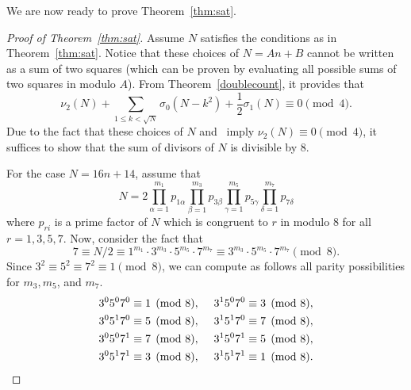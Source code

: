 \documentclass[a4paper,oneside,reqno]{amsart}
\theoremstyle{plain}
\theoremstyle{definition}
\theoremstyle{remark}
\begin{document}
		We are now ready to prove Theorem~\ref{thm:sat}.
		\begin{proof}[Proof of Theorem~\ref{thm:sat}]
		Assume $N$ satisfies the conditions as in Theorem~\ref{thm:sat}. Notice that these choices of $N=An+B$ cannot be written as a sum of two squares (which can be proven by evaluating all possible sums of two squares in modulo $A$).  From Theorem~\ref{doublecount}, it provides that
		$$\nu_2(N)+\sum\limits_{1 \leq k < \sqrt{N}} \sigma_0(N-k^2)+\frac{1}{2}\sigma_1(N) \equiv 0 \pmod4.$$
		Due to the fact that these choices of $N$ and~\cite{keith2017partitions} imply $\nu_2(N)\equiv0\pmod4$, it suffices to show that the sum of divisors of $N$ is divisible by 8.
		
		For the case $N=16n+14$, assume that
		$$N=2\prod_{\alpha=1}^{m_1}p_{1\alpha} \prod_{\beta=1}^{m_3}p_{3\beta} \prod_{\gamma=1}^{m_5}p_{5\gamma} \prod_{\delta=1}^{m_7}p_{7\delta}$$
		where $p_{ri}$ is a prime factor of $N$ which is congruent to $r$ in modulo 8 for all $r=1,3,5,7$.
		Now, consider the fact that
		\[
		7\equiv N/2 \equiv 1^{m_1}\cdot3^{m_3}\cdot5^{m_5}\cdot7^{m_7}\equiv3^{m_3}\cdot5^{m_5}\cdot7^{m_7}\pmod8.
		\]
        Since $3^2\equiv5^2\equiv7^2\equiv1\pmod8$, we can compute as follows all parity possibilities for $m_3, m_5$, and $m_7$.
		\[
		\begin{split}
			3^0 5^0 7^0 \equiv 1 \pmod8, \hspace{5mm}
			& 3^1 5^0 7^0 \equiv 3 \pmod8,\\
			3^0 5^1 7^0 \equiv 5 \pmod8, \hspace{5mm}
			& 3^1 5^1 7^0 \equiv 7 \pmod8, \\
			3^0 5^0 7^1 \equiv 7 \pmod8, \hspace{5mm}
			& 3^1 5^0 7^1 \equiv 5 \pmod8, \\
			3^0 5^1 7^1 \equiv 3 \pmod8, \hspace{5mm}
			& 3^1 5^1 7^1 \equiv 1 \pmod8.
		\end{split}
		\]
        
		

\end{proof}
\end{document}

